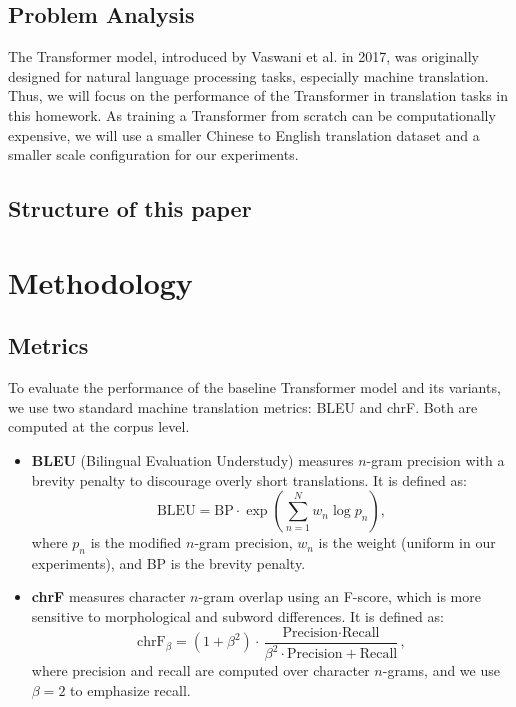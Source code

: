 \documentclass{article}
\begin{document}
\subsection{Problem Analysis}
The Transformer model, introduced by Vaswani et al. in 2017, was originally designed for natural language processing tasks, especially machine translation.
Thus, we will focus on the performance of the Transformer in translation tasks in this homework.
As training a Transformer from scratch can be computationally expensive, we will use a smaller Chinese to English translation dataset and a smaller scale configuration for our experiments.

\subsection{Structure of this paper}

\section{Methodology}
\label{sec:methodology}

\subsection{Metrics}
\label{sec:metrics}
To evaluate the performance of the baseline Transformer model and its variants, we use two standard machine translation metrics: BLEU and chrF. Both are computed at the corpus level.
\begin{itemize}
        \item \textbf{BLEU} (Bilingual Evaluation Understudy) measures $n$-gram precision with a brevity penalty to discourage overly short translations. It is defined as:
        \[
        \text{BLEU} = \text{BP} \cdot \exp\left(\sum_{n=1}^{N} w_n \log p_n\right),
        \]
        where $p_n$ is the modified $n$-gram precision, $w_n$ is the weight (uniform in our experiments), and BP is the brevity penalty.

        \item \textbf{chrF} measures character $n$-gram overlap using an F-score, which is more sensitive to morphological and subword differences. It is defined as:
        \[
        \text{chrF}_\beta = (1 + \beta^2) \cdot \frac{\text{Precision} \cdot \text{Recall}}{\beta^2 \cdot \text{Precision} + \text{Recall}},
        \]
        where precision and recall are computed over character $n$-grams, and we use $\beta = 2$ to emphasize recall.
\end{itemize}
\end{document}
